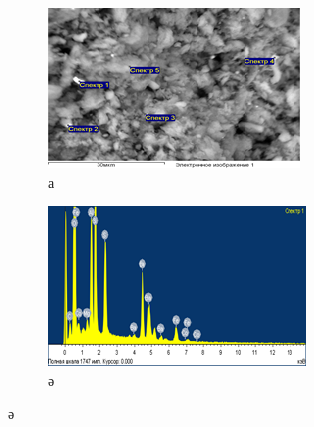 \begin{figure}[H]
    \centering
    \begin{subfigure}[b]{0.45\textwidth}
        \centering
        \includegraphics[width=\textwidth]{assets/1046}
        \caption*{а}
    \end{subfigure}
    \hfill
    \begin{subfigure}[b]{0.45\textwidth}
        \centering
        \includegraphics[width=\textwidth]{assets/1046.1}
        \caption*{ә}
    \end{subfigure}
\end{figure}

